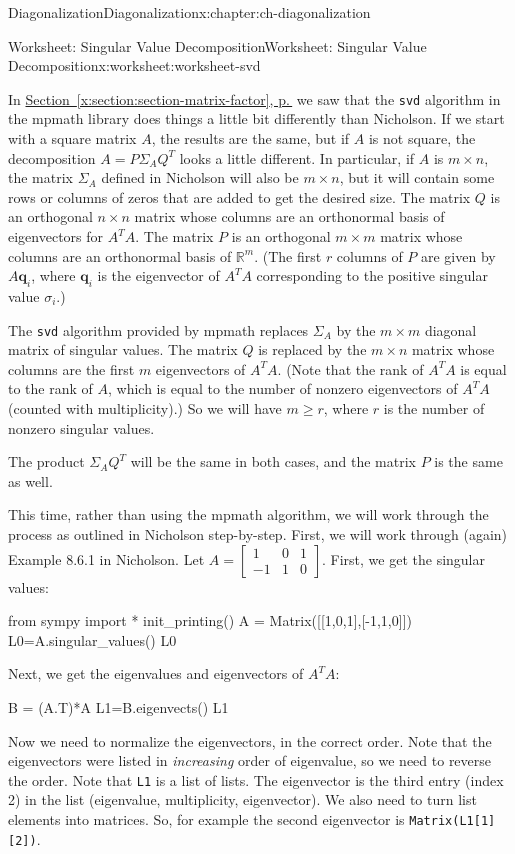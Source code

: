 \documentclass[oneside,10pt,]{book}
\newcommand{\xreffont}{\relax}
\newcommand{\mono}[1]{\texttt{#1}}
\numberwithin{equation}{section}
\newcommand{\bbm}{\begin{bmatrix}}
\newcommand{\ebm}{\end{bmatrix}}
\newcommand{\R}{\mathbb{R}}
\newcommand{\vecq}{\mathbf{q}}
\newcommand{\amp}{&}
\begin{document}
\begin{chapterptx}{Diagonalization}{}{Diagonalization}{}{}{x:chapter:ch-diagonalization}
\begin{worksheet-section}{Worksheet: Singular Value Decomposition}{}{Worksheet: Singular Value Decomposition}{}{}{x:worksheet:worksheet-svd}
\par
In \hyperref[x:section:section-matrix-factor]{Section~{\xreffont\ref{x:section:section-matrix-factor}}, p.\,\pageref{x:section:section-matrix-factor}} we saw that the \mono{svd} algorithm in the mpmath library does things a little bit differently than Nicholson. If we start with a square matrix \(A\), the results are the same, but if \(A\) is not square, the decomposition \(A = P\Sigma_A Q^T\) looks a little different. In particular, if \(A\) is \(m\times n\), the matrix \(\Sigma_A\) defined in Nicholson will also be \(m\times n\), but it will contain some rows or columns of zeros that are added to get the desired size. The matrix \(Q\) is an orthogonal \(n\times n\) matrix whose columns are an orthonormal basis of eigenvectors for \(A^TA\). The matrix \(P\) is an orthogonal \(m\times m\) matrix whose columns are an orthonormal basis of \(\R^m\). (The first \(r\) columns of \(P\) are given by \(A\vecq_i\), where \(\vecq_i\) is the eigenvector of \(A^TA\) corresponding to the positive singular value \(\sigma_i\).)%
\par
The \mono{svd} algorithm provided by mpmath replaces \(\Sigma_A\) by the \(m\times m\) diagonal matrix of singular values. The matrix \(Q\) is replaced by the \(m\times n\) matrix whose columns are the first \(m\) eigenvectors of \(A^TA\). (Note that the rank of \(A^TA\) is equal to the rank of \(A\), which is equal to the number of nonzero eigenvectors of \(A^TA\) (counted with multiplicity).) So we will have \(m\geq r\), where \(r\) is the number of nonzero singular values.%
\par
The product \(\Sigma_A Q^T\) will be the same in both cases, and the matrix \(P\) is the same as well.%
\par
This time, rather than using the mpmath algorithm, we will work through the process as outlined in Nicholson step-by-step. First, we will work through (again) Example 8.6.1 in Nicholson. Let \(A = \bbm 1\amp 0\amp 1\\-1\amp 1\amp 0\ebm\). First, we get the singular values:%
\begin{sageinput}
from sympy import *
init_printing()
A = Matrix([[1,0,1],[-1,1,0]])
L0=A.singular_values()
L0
\end{sageinput}
Next, we get the eigenvalues and eigenvectors of \(A^TA\):%
\begin{sageinput}
B = (A.T)*A
L1=B.eigenvects()
L1
\end{sageinput}
Now we need to normalize the eigenvectors, in the correct order. Note that the eigenvectors were listed in \emph{increasing} order of eigenvalue, so we need to reverse the order. Note that \mono{L1} is a list of lists. The eigenvector is the third entry (index 2) in the list (eigenvalue, multiplicity, eigenvector). We also need to turn list elements into matrices. So, for example the second eigenvector is \mono{Matrix(L1[1][2])}.%

\end{worksheet-section}
\end{chapterptx}
\end{document}
